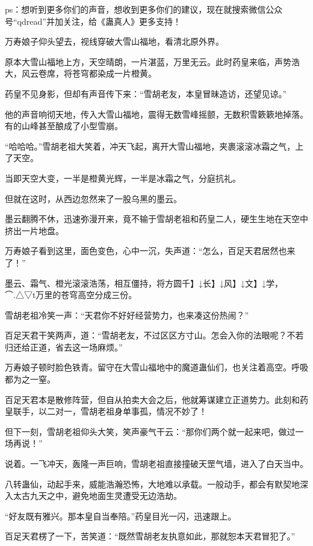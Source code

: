 
\begin{this_body}

ps：想听到更多你们的声音，想收到更多你们的建议，现在就搜索微信公众号“qdread”并加关注，给《蛊真人》更多支持！

万寿娘子仰头望去，视线穿破大雪山福地，看清北原外界。

原本大雪山福地上方，天空晴朗，一片湛蓝，万里无云。此时药皇来临，声势浩大，风云卷席，将苍穹都染成一片橙黄。

药皇不见身影，但却有声音传下来：“雪胡老友，本皇冒昧造访，还望见谅。”

他的声音响彻天地，传入大雪山福地，震得无数雪峰摇颤，无数积雪簌簌地掉落。有的山峰甚至酿成了小型雪崩。

“哈哈哈。”雪胡老祖大笑着，冲天飞起，离开大雪山福地，夹裹滚滚冰霜之气，上了天空。

当即天空大变，一半是橙黄光辉，一半是冰霜之气，分庭抗礼。

但就在这时，从西边忽然来了一股乌黑的墨云。

墨云翻腾不休，迅速弥漫开来，竟不输于雪胡老祖和药皇二人，硬生生地在天空中挤出一片地盘。

万寿娘子看到这里，面色变色，心中一沉，失声道：“怎么，百足天君居然也来了！”

墨云、霜气、橙光滚滚浩荡，相互僵持，将方圆千】↓长】↓风】↓文】↓学，⌒.△▽t万里的苍穹高空分成三份。

雪胡老祖冷笑一声：“天君你不好好经营势力，也来凑这份热闹？”

百足天君干笑两声，道：“雪胡老友，不过区区方寸山。怎会入你的法眼呢？不若归还给正道，省去这一场麻烦。”

万寿娘子顿时脸色铁青。留守在大雪山福地中的魔道蛊仙们，也关注着高空。呼吸都为之一窒。

百足天君本是散修阵营，但自从拍卖大会之后，他就筹谋建立正道势力。此刻和药皇联手，以二对一，雪胡老祖身单事孤，情况不妙了！

但下一刻，雪胡老祖仰头大笑，笑声豪气干云：“那你们两个就一起来吧，做过一场再说！”

说着。一飞冲天，轰隆一声巨响，雪胡老祖直接撞破天罡气墙，进入了白天当中。

八转蛊仙，动起手来，威能浩瀚恐怖，大地难以承载。一般动手，都会有默契地深入太古九天之中，避免地面生灵遭受无边浩劫。

“好友既有雅兴。那本皇自当奉陪。”药皇目光一闪，迅速跟上。

百足天君楞了一下，苦笑道：“既然雪胡老友执意如此，那就恕本天君冒犯了。”


\end{this_body}
